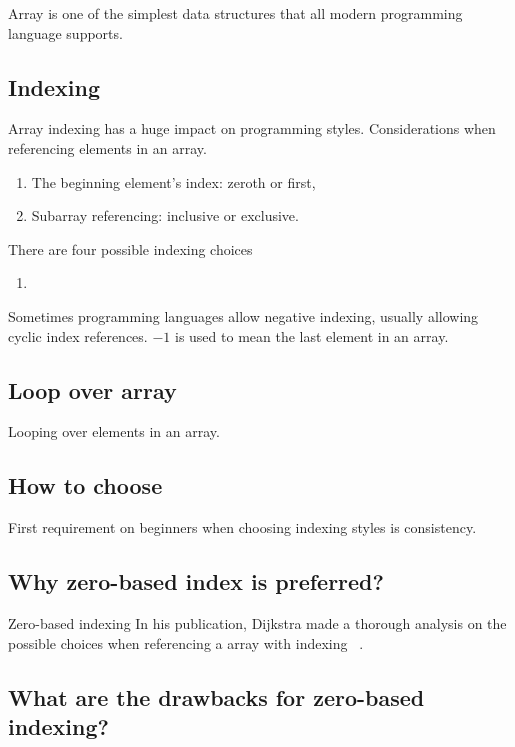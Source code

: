 \documentclass[oneside,11pt]{book}
\theoremstyle{definition}
\theoremstyle{remark}
\begin{document}
Array is one of the simplest data structures that all modern programming language supports.

\subsection{Indexing}\label{subsec:indexing}

Array indexing has a huge impact on programming styles.
Considerations when referencing elements in an array.
\begin{enumerate}
    \item The beginning element's index: zeroth or first,
    \item Subarray referencing: inclusive or exclusive.
\end{enumerate}
There are four possible indexing choices
\begin{enumerate}
    \item
\end{enumerate}

Sometimes programming languages allow negative indexing, usually allowing cyclic index
references.
$-1$ is used to mean the last element in an array.

\subsection{Loop over array}

Looping over elements in an array.

\subsection{How to choose}\label{subsec:howToChoose}

First requirement on beginners when choosing indexing styles is consistency.

\subsection{Why zero-based index is preferred?}

Zero-based indexing In his publication, Dijkstra made a thorough analysis on the possible choices
when referencing a
array with indexing ~\cite{Dijkstra-2008}.

\subsection{What are the drawbacks for zero-based indexing?}
\end{document}
